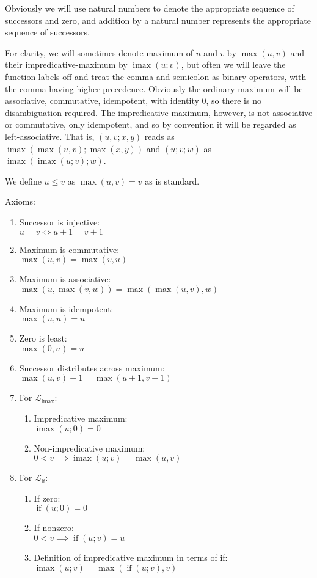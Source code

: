 \documentclass[11pt, twoside, reqno]{book}
\DeclareMathOperator{\imax}{imax}
\DeclareMathOperator{\ifop}{if}
\begin{document}
Obviously we will use natural numbers to denote the appropriate sequence of successors and zero, and addition by a natural number represents the appropriate sequence of successors.

For clarity, we will sometimes denote maximum of $u$ and $v$ by $\max(u, v)$ and their impredicative-maximum by $\imax(u; v)$, but often we will leave the function labels off and treat the comma and semicolon as binary operators, with the comma having higher precedence.
Obviously the ordinary maximum will be associative, commutative, idempotent, with identity $0$, so there is no disambiguation required.
The impredicative maximum, however, is not associative or commutative, only idempotent, and so by convention it will be regarded as left-associative.
That is, $(u, v; x, y)$ reads as $\imax(\max(u, v); \max(x, y))$ and $(u; v; w)$ as $\imax(\imax(u; v); w)$.

We define $u \le v$ as $\max(u, v) = v$ as is standard.

Axioms:
\label{alg-uni-laws}
\begin{enumerate}
\item Successor is injective:\\
  $u = v \iff u+1 = v+1$
\item Maximum is commutative:\\
  $\max(u, v) = \max(v, u)$
\item Maximum is associative:\\
  $\max(u, \max(v, w)) = \max(\max(u, v), w)$
\item Maximum is idempotent:\\
  $\max(u, u) = u$
\item Zero is least:\\
  $\max(0, u) = u$
\item Successor distributes across maximum:\\
  $\max(u, v) + 1 = \max(u + 1, v + 1)$
\item For $\mathcal{L}_{\imax}$:
\begin{enumerate}
\item Impredicative maximum:\\
  $\imax(u; 0) = 0$
\item Non-impredicative maximum:\\
  $0 < v \implies \imax(u; v) = \max(u, v)$
\end{enumerate}
\item For $\mathcal{L}_{\ifop}$:
\begin{enumerate}
\item If zero:\\
  $\ifop(u; 0) = 0$
\item If nonzero:\\
  $0 < v \implies \ifop(u; v) = u$
\item Definition of impredicative maximum in terms of if:\\
  $\imax(u; v) = \max(\ifop(u; v), v)$
\end{enumerate}
\end{enumerate}
\end{document}
